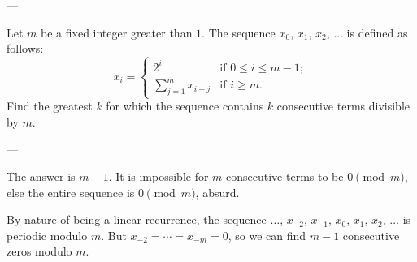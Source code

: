 
---

Let $m$ be a fixed integer greater than $1$. The sequence $x_0$, $x_1$, $x_2$, $\ldots$ is defined as follows:
\[x_i=\begin{cases}2^i&\text{if }0\le i\le m-1;\\ \sum_{j=1}^mx_{i-j}&\text{if }i\ge m.\end{cases}\]
Find the greatest $k$ for which the sequence contains $k$ consecutive terms divisible by $m$.

---

The answer is $m-1$. It is impossible for $m$ consecutive terms to be $0\pmod m$, else the entire sequence is $0\pmod m$, absurd.

By nature of being a linear recurrence, the sequence $\ldots$, $x_{-2}$, $x_{-1}$, $x_0$, $x_1$, $x_2$, $\ldots$ is periodic modulo $m$. But $x_{-2}=\cdots=x_{-m}=0$, so we can find $m-1$ consecutive zeros modulo $m$.


